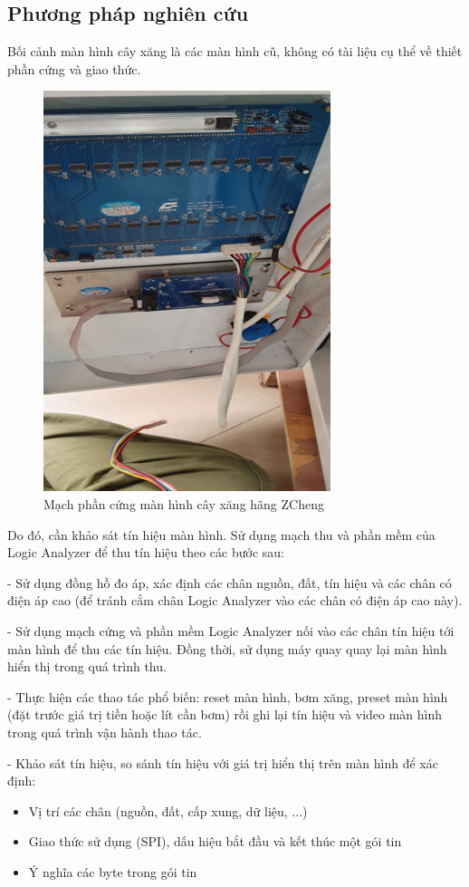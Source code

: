 \subsection{Phương pháp nghiên cứu}

\hspace{1cm} Bối cảnh màn hình cây xăng là các màn hình cũ, không có tài liệu cụ thể về thiết phần cứng và giao thức.

\begin{figure}[!ht]
    \centering
    \includegraphics[width=0.5\linewidth]{Figures/Chap1_Zcheng-screen-hardware.png}
    \caption{Mạch phần cứng màn hình cây xăng hãng ZCheng}
    \label{fig:hinh1.1}
\end{figure}

Do đó, cần khảo sát tín hiệu màn hình. Sử dụng mạch thu và phần mềm của Logic Analyzer để thu tín hiệu theo các bước sau:

- Sử dụng đồng hồ đo áp, xác định các chân nguồn, đất, tín hiệu và các chân có điện áp cao (để tránh cắm chân Logic Analyzer vào các chân có điện áp cao này).

- Sử dụng mạch cứng và phần mềm Logic Analyzer nối vào các chân tín hiệu tới màn hình để thu các tín hiệu. Đồng thời, sử dụng máy quay quay lại màn hình hiển thị trong quá trình thu.

- Thực hiện các thao tác phổ biến: reset màn hình, bơm xăng, preset màn hình (đặt trước giá trị tiền hoặc lít cần bơm) rồi ghi lại tín hiệu và video màn hình trong quá trình vận hành thao tác.

- Khảo sát tín hiệu, so sánh tín hiệu với giá trị hiển thị trên màn hình để xác định:

\begin{itemize}
   \item Vị trí các chân (nguồn, đất, cấp xung, dữ liệu, ...)
   \item Giao thức sử dụng (SPI), dấu hiệu bắt đầu và kết thúc một gói tin
   \item Ý nghĩa các byte trong gói tin
\end{itemize}

